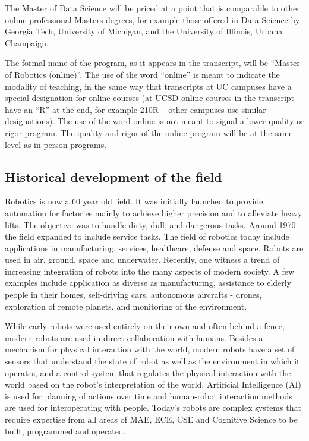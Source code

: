 \documentclass[11pt,letterpaper]{article}
\begin{document}
The Master of Data Science will be priced at a point that is
comparable to other online professional Masters degrees, for example
those offered in Data Science by Georgia Tech, University of Michigan,
and the University of Illinois, Urbana Champaign.

The formal name of the program, as it appears in the transcript, will
be “Master of Robotics (online)”. The use of the word “online” is
meant to indicate the modality of teaching, in the same way that
transcripts at UC campuses have a special designation for online
courses (at UCSD online courses in the transcript have an “R” at the
end, for example 210R -- other campuses use similar designations). The
use of the word online is not meant to signal a lower quality or rigor
program. The quality and rigor of the online program will be at the
same level as in-person programs. 

\subsection{Historical development of the field}

Robotics is now a 60 year old field. It was initially launched to
provide automation for factories mainly to achieve higher precision
and to alleviate heavy lifts. The objective was to handle dirty, dull,
and dangerous tasks. Around 1970 the field expanded to include service
tasks. The field of robotics today include applications in
manufacturing, services, healthcare, defense and space. Robots are
used in air, ground, space and underwater. Recently, one witness a
trend of increasing integration of robots into the many aspects of
modern society. A few examples include application as diverse as
manufacturing, assistance to elderly people in their homes,
self-driving cars, autonomous aircrafts - drones, exploration of
remote planets, and monitoring of the environment.

While early robots were used entirely on their own and often behind a
fence, modern robots are used in direct collaboration with
humans. Besides a mechanism for physical interaction with the world,
modern robots have a set of sensors that understand the state of robot
as well as the environment in which it operates, and a control system
that regulates the physical interaction with the world based on the
robot's interpretation of the world. Artificial Intelligence (AI) is
used for planning of actions over time and human-robot interaction
methods are used for interoperating with people. Today's robots are
complex systems that require expertise from all areas of MAE, ECE, CSE
and Cognitive Science to be built, programmed and operated.
\end{document}
